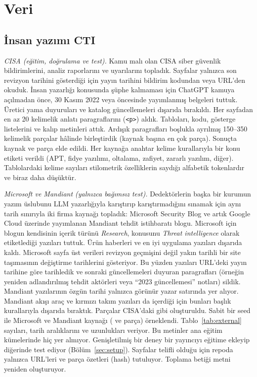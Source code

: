 \documentclass[journal]{IEEEtran}
\begin{document}
\section{Veri}\label{sec:data}

\subsection{İnsan yazımı CTI}
\emph{CISA (eğitim, doğrulama ve test).} Kamu malı olan CISA siber güvenlik bildirimlerini, analiz raporlarını ve
uyarılarını topladık. Sayfalar yalnızca son revizyon tarihini gösterdiği için yayın tarihini bildirim kodundan veya
URL'den okuduk. İnsan yazarlığı konusunda şüphe kalmaması için ChatGPT kamuya açılmadan önce, 30 Kasım 2022 veya
öncesinde yayımlanmış belgeleri tuttuk. Üretici yama duyuruları ve katalog güncellemeleri dışarıda bırakıldı. Her
sayfadan en az 20 kelimelik anlatı paragraflarını (\texttt{<p>}) aldık. Tabloları, kodu, gösterge listelerini ve
kalıp metinleri attık. Ardışık paragrafları boşlukla ayrılmış 150--350 kelimelik parçalar hâlinde birleştirdik
(kaynak başına en çok \MaxChunks{} parça). Sonuçta \NSources{} kaynak ve \NHumanChunks{} parça elde edildi. Her
kaynağa anahtar kelime kurallarıyla bir konu etiketi verildi (APT, fidye yazılımı, oltalama, zafiyet, zararlı
yazılım, diğer). Tablolardaki kelime sayıları stilometrik özelliklerin saydığı alfabetik tokenlardır ve biraz daha
düşüktür.

\emph{Microsoft ve Mandiant (yalnızca bağımsız test).} Dedektörlerin başka bir kurumun yazım üslubunu LLM
yazarlığıyla karıştırıp karıştırmadığını sınamak için aynı tarih sınırıyla iki firma kaynağı topladık: Microsoft
Security Blog ve artık Google Cloud üzerinde yayımlanan Mandiant tehdit istihbaratı blogu. Microsoft için blogun
kendisinin içerik türünü \emph{Research}, konusunu \emph{Threat intelligence} olarak etiketlediği yazıları tuttuk.
Ürün haberleri ve en iyi uygulama yazıları dışarıda kaldı. Microsoft sayfa üst verileri revizyon geçmişini değil
yakın tarihli bir site taşımasının değiştirme tarihlerini gösteriyor. Bu yüzden yazıları URL'deki yayın tarihine
göre tarihledik ve sonraki güncellemeleri duyuran paragrafları (örneğin yeniden adlandırılmış tehdit aktörleri veya
``2023 güncellemesi'' notları) sildik. Mandiant yazılarının özgün tarihi yalnızca görünür yazar satırında yer
alıyor. Mandiant akışı araç ve kırmızı takım yazıları da içerdiği için bunları başlık kurallarıyla dışarıda
bıraktık. Parçalar CISA'daki gibi oluşturuldu. Sabit bir seed ile \NExtSourcesMicrosoft{} Microsoft ve
\NExtSourcesMandiant{} Mandiant kaynağı (\NExtChunksMicrosoft{} ve \NExtChunksMandiant{} parça) örneklendi.
Tablo~\ref{tab:external} sayıları, tarih aralıklarını ve uzunlukları veriyor. Bu metinler ana eğitim kümelerinde
hiç yer almıyor. Genişletilmiş bir deney bir yayıncıyı eğitime ekleyip diğerinde test ediyor
(Bölüm~\ref{sec:setup}). Sayfalar telifli olduğu için repoda yalnızca URL'leri ve parça özetleri (hash) tutuluyor.
Toplama betiği metni yeniden oluşturuyor.
\end{document}
